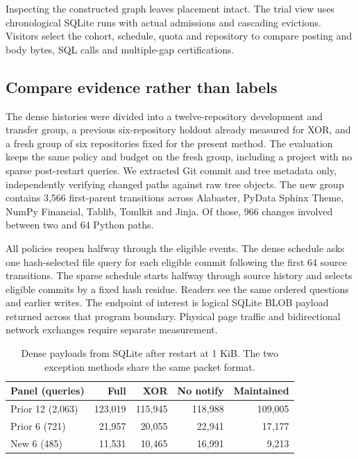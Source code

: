 \documentclass[conference]{IEEEtran}
\begin{document}
Inspecting the constructed graph leaves placement intact. The trial view uses chronological SQLite runs with actual admissions and cascading evictions. Visitors select the cohort, schedule, quota and repository to compare posting and body bytes, SQL calls and multiple-gap certifications.

\subsection{Compare evidence rather than labels}
The dense histories were divided into a twelve-repository development and transfer group, a previous six-repository holdout already measured for XOR, and a fresh group of six repositories fixed for the present method. The evaluation keeps the same policy and budget on the fresh group, including a project with no sparse post-restart queries. We extracted Git commit and tree metadata only, independently verifying changed paths against raw tree objects. The new group contains 3,566 first-parent transitions across Alabaster, PyData Sphinx Theme, NumPy Financial, Tablib, Tomlkit and Jinja. Of those, 966 changes involved between two and 64 Python paths.

All policies reopen halfway through the eligible events. The dense schedule asks one hash-selected file query for each eligible commit following the first 64 source transitions. The sparse schedule starts halfway through source history and selects eligible commits by a fixed hash residue. Readers see the same ordered questions and earlier writes. The endpoint of interest is logical SQLite BLOB payload returned across that program boundary. Physical page traffic and bidirectional network exchanges require separate measurement.

\begin{table}[t]\centering
\caption{Dense payloads from SQLite after restart at 1 KiB. The two exception methods share the same packet format.}\label{tab:main}
\begin{tabular}{lrrrr}\toprule
Panel (queries) & Full & XOR & No notify & Maintained\\\midrule
Prior 12 (2,063) & 123,019 & 115,945 & 118,988 & 109,005\\
Prior 6 (721) & 21,957 & 20,055 & 22,941 & 17,177\\
New 6 (485) & 11,531 & 10,465 & 16,991 & 9,213\\\bottomrule
\end{tabular}
\end{table}
\end{document}
